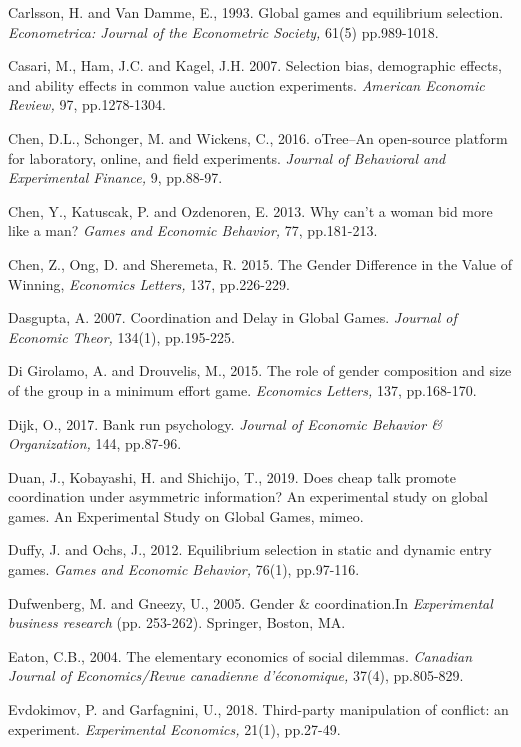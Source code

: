 \documentclass[11pt, letterpaper]{article}
\theoremstyle{plain}
\begin{document}
\begin{thebibliography}{10}
\bibitem{} Carlsson, H. and Van Damme, E., 1993. Global games and equilibrium selection. \textit{Econometrica: Journal of the Econometric Society,} 61(5) pp.989-1018.

\bibitem{} Casari, M., Ham, J.C. and Kagel, J.H. 2007. Selection bias, demographic effects, and ability effects in common value auction experiments. \textit{American Economic Review,} 97, pp.1278-1304.

 Chen, D.L., Schonger, M. and Wickens, C., 2016. oTree--An open-source platform for laboratory, online, and field experiments. \textit{Journal of Behavioral and Experimental Finance,} 9, pp.88-97.

 Chen, Y., Katuscak, P. and Ozdenoren, E. 2013. Why can't a woman bid more like a man? \textit{Games and Economic Behavior,} 77, pp.181-213.

 Chen, Z., Ong, D. and Sheremeta, R. 2015. The Gender Difference in the Value of Winning, \textit{Economics Letters,} 137, pp.226-229.

Dasgupta, A. 2007. Coordination and Delay in Global Games. \textit{Journal of Economic Theor,} 134(1), pp.195-225.

 Di Girolamo, A. and Drouvelis, M., 2015. The role of gender composition and size of the group in a minimum effort game. \textit{Economics Letters,} 137, pp.168-170.

 Dijk, O., 2017. Bank run psychology. \textit{Journal of Economic Behavior \& Organization,} 144, pp.87-96.

 Duan, J., Kobayashi, H. and Shichijo, T., 2019. Does cheap talk promote coordination under asymmetric information? An experimental study on global games. An Experimental Study on Global Games, mimeo.




\bibitem{} Duffy, J. and Ochs, J., 2012. Equilibrium selection in static and dynamic entry games. \textit{Games and Economic Behavior,} 76(1), pp.97-116.

\bibitem{} Dufwenberg, M. and Gneezy, U., 2005. Gender \& coordination.In \textit{Experimental business research} (pp. 253-262). Springer, Boston, MA.

\bibitem{}Eaton, C.B., 2004. The elementary economics of social dilemmas. \textit{Canadian Journal of Economics/Revue canadienne d'\'{e}conomique,} 37(4), pp.805-829.

  Evdokimov, P. and Garfagnini, U., 2018. Third-party manipulation of conflict: an experiment. \textit{Experimental Economics,} 21(1), pp.27-49.


\end{thebibliography}
\end{document}
